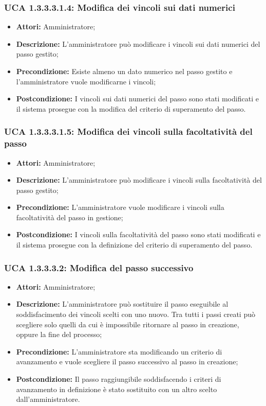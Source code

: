 \subsubsection{UCA 1.3.3.3.1.4: Modifica dei vincoli sui dati numerici}
\begin{itemize}
\item \textbf{Attori:}
 Amministratore;
\item \textbf{Descrizione:} 
L'amministratore può modificare i vincoli sui dati numerici del passo gestito;
\item \textbf{Precondizione:} 
Esiste almeno un dato numerico nel passo gestito e l'amministratore vuole modificarne i vincoli;
\item \textbf{Postcondizione:} 
I vincoli sui dati numerici del passo sono stati modificati e il sistema prosegue con la modifica del criterio di superamento del passo.
\end{itemize}

\hypertarget{A1.3.3.3.1.5}{}
\subsubsection{UCA 1.3.3.3.1.5: Modifica dei vincoli sulla facoltatività del passo}
\begin{itemize}
\item \textbf{Attori:}
 Amministratore;
\item \textbf{Descrizione:} 
L'amministratore può modificare i vincoli sulla facoltatività del passo gestito;
\item \textbf{Precondizione:} 
L'amministratore vuole modificare i vincoli sulla facoltatività del passo in gestione;
\item \textbf{Postcondizione:} 
I vincoli sulla facoltatività del passo sono stati modificati e il sistema prosegue con la definizione del criterio di superamento del passo.
\end{itemize}

\hypertarget{A1.3.3.3.2}{}
\subsubsection{UCA 1.3.3.3.2: Modifica del passo successivo}
\begin{itemize}
\item \textbf{Attori:}
 Amministratore;
\item \textbf{Descrizione:}
 L'amministratore può sostituire il passo eseguibile al soddisfacimento dei vincoli scelti con uno nuovo. Tra tutti i passi creati può scegliere solo quelli da cui è impossibile ritornare al passo in creazione, oppure la fine del processo;
\item \textbf{Precondizione:} 
L'amministratore sta modificando un criterio di avanzamento e vuole scegliere il passo successivo al passo in creazione;
\item \textbf{Postcondizione:} 
Il passo raggiungibile soddisfacendo i criteri di avanzamento in definizione è stato sostituito con un altro scelto dall'amministratore.
\end{itemize}

